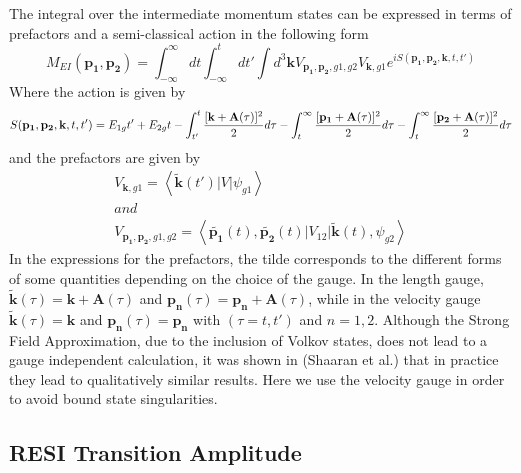\documentclass[11pt]{article}
\numberwithin{equation}{section}
\begin{document}
The integral over the intermediate momentum states can be expressed in terms of prefactors and a semi-classical action in the following form
\begin{equation} \label{eq2}
   M_{EI}(\mathbf{p_1},\mathbf{p_2}) = \int_{-\infty}^{\infty}dt\int_{-\infty}^{t}dt'\int d^3\mathbf{k}   V_{\mathbf{p_1},\mathbf{p_2},g1,g2}V_{\mathbf{k},g1} e^{iS(\mathbf{p_1}, \mathbf{p_2}, \mathbf{k},t,t')}
\end{equation}
Where the action is given by
\begin{equation}
    S(\mathbf{p_1},\mathbf{p_2},\mathbf{k},t,t') = E_{1g}t' + E_{2g}t \\ - \int_{t'}^t \frac{[\mathbf{k}+ \mathbf{A} (\tau)]^2}{2} d \tau - \int_{t}^{\infty} \frac{[\mathbf{p_1}+ \mathbf{A} (\tau)]^2}{2} d \tau - \int_{t}^{\infty} \frac{[\mathbf{p_2}+ \mathbf{A} (\tau)]^2}{2} d \tau
\end{equation}
and the prefactors are given by
\begin{equation}
    \begin{gathered}
        V_{\mathbf{k},g1} = \left \langle \tilde{\mathbf{k}}(t') |V |\psi_{g1} \right \rangle  \\
        and \\
        V_{\mathbf{p_1},\mathbf{p_2},g1,g2} = \left \langle \tilde{\mathbf{p_1}}(t), \tilde{\mathbf{p_2}}(t) |V_{12} |\tilde{\mathbf{k}}(t), \psi_{g2}\right \rangle
    \end{gathered}
\end{equation}
In the expressions for the prefactors, the tilde corresponds to the different forms of some quantities depending on the choice of the gauge. In the length gauge, $\tilde{\mathbf{k}}(\tau) = \mathbf{k} + \mathbf{A}(\tau)$ and $\mathbf{p_n}(\tau) = \mathbf{p_n} + \mathbf{A}(\tau)$, while in the velocity gauge $\tilde{\mathbf{k}}(\tau) = \mathbf{k}$ and $\mathbf{p_n}(\tau) = \mathbf{p_n}$ with $(\tau = t, t')$ and $n = 1,2$. Although the Strong Field Approximation, due to the inclusion of Volkov states, does not lead to a gauge independent calculation, it was shown in (Shaaran et al.)\cite{shaaran_2010_laserinduced_b} that in practice they lead to qualitatively similar results. Here we use the velocity gauge in order to avoid bound state singularities.

\subsection{RESI Transition Amplitude}\label{ch:RESI}
\end{document}
